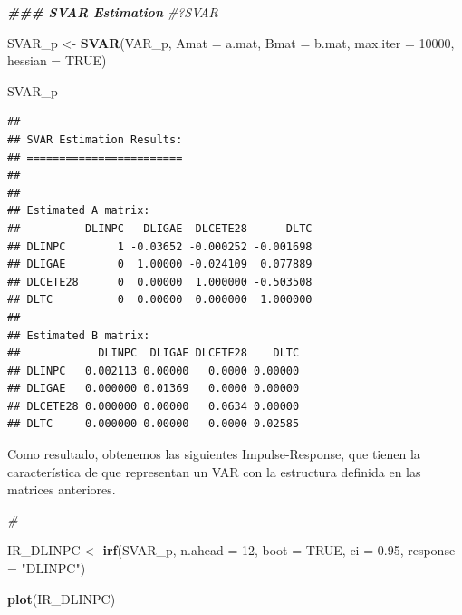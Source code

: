 \documentclass[
]{book}
\newenvironment{Shaded}{\begin{snugshade}}{\end{snugshade}}
\newcommand{\AttributeTok}[1]{\textcolor[rgb]{0.13,0.29,0.53}{#1}}
\newcommand{\CommentTok}[1]{\textcolor[rgb]{0.56,0.35,0.01}{\textit{#1}}}
\newcommand{\ConstantTok}[1]{\textcolor[rgb]{0.56,0.35,0.01}{#1}}
\newcommand{\DecValTok}[1]{\textcolor[rgb]{0.00,0.00,0.81}{#1}}
\newcommand{\DocumentationTok}[1]{\textcolor[rgb]{0.56,0.35,0.01}{\textbf{\textit{#1}}}}
\newcommand{\FloatTok}[1]{\textcolor[rgb]{0.00,0.00,0.81}{#1}}
\newcommand{\FunctionTok}[1]{\textcolor[rgb]{0.13,0.29,0.53}{\textbf{#1}}}
\newcommand{\NormalTok}[1]{#1}
\newcommand{\OtherTok}[1]{\textcolor[rgb]{0.56,0.35,0.01}{#1}}
\newcommand{\StringTok}[1]{\textcolor[rgb]{0.31,0.60,0.02}{#1}}
\begin{document}
\begin{Shaded}
\begin{Highlighting}[]
\DocumentationTok{\#\#\# SVAR Estimation}
\CommentTok{\#?SVAR}

\NormalTok{SVAR\_p }\OtherTok{\textless{}{-}} \FunctionTok{SVAR}\NormalTok{(VAR\_p, }\AttributeTok{Amat =}\NormalTok{ a.mat, }\AttributeTok{Bmat =}\NormalTok{ b.mat, }\AttributeTok{max.iter =} \DecValTok{10000}\NormalTok{, }\AttributeTok{hessian =} \ConstantTok{TRUE}\NormalTok{)}

\NormalTok{SVAR\_p}
\end{Highlighting}
\end{Shaded}

\begin{verbatim}
## 
## SVAR Estimation Results:
## ======================== 
## 
## 
## Estimated A matrix:
##          DLINPC   DLIGAE  DLCETE28      DLTC
## DLINPC        1 -0.03652 -0.000252 -0.001698
## DLIGAE        0  1.00000 -0.024109  0.077889
## DLCETE28      0  0.00000  1.000000 -0.503508
## DLTC          0  0.00000  0.000000  1.000000
## 
## Estimated B matrix:
##            DLINPC  DLIGAE DLCETE28    DLTC
## DLINPC   0.002113 0.00000   0.0000 0.00000
## DLIGAE   0.000000 0.01369   0.0000 0.00000
## DLCETE28 0.000000 0.00000   0.0634 0.00000
## DLTC     0.000000 0.00000   0.0000 0.02585
\end{verbatim}

Como resultado, obtenemos las siguientes Impulse-Response, que tienen la característica de que representan un VAR con la estructura definida en las matrices anteriores.

\begin{Shaded}
\begin{Highlighting}[]
\CommentTok{\#}

\NormalTok{IR\_DLINPC }\OtherTok{\textless{}{-}} \FunctionTok{irf}\NormalTok{(SVAR\_p, }\AttributeTok{n.ahead =} \DecValTok{12}\NormalTok{, }\AttributeTok{boot =} \ConstantTok{TRUE}\NormalTok{, }
                 \AttributeTok{ci =} \FloatTok{0.95}\NormalTok{, }\AttributeTok{response =} \StringTok{"DLINPC"}\NormalTok{)}

\FunctionTok{plot}\NormalTok{(IR\_DLINPC)}
\end{Highlighting}
\end{Shaded}
\end{document}
